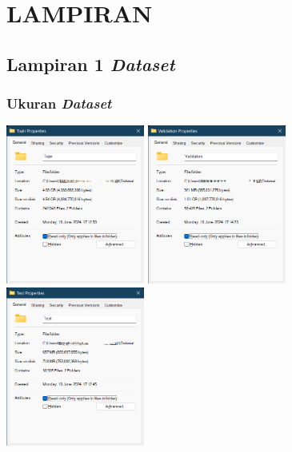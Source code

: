 \documentclass[12pt,oneside,bahasa]{book}
\newcommand{\appendixpagenumbering}{
    \renewcommand{\thepage}{L-\arabic{page}}
}
\begin{document}
\chapter*{LAMPIRAN}

\setcounter{page}{1}
\appendixpagenumbering
\thispagestyle{appendixstyle}
\pagestyle{appendixstyle}

\section*{Lampiran 1 \emph{Dataset}}


\subsection*{Ukuran \emph{Dataset}}
\begin{center}
  \includegraphics[width=4.55cm]{images/prop_train} \includegraphics[width=4.55cm]{images/prop_valid}
  \includegraphics[width=4.55cm]{images/prop_test}
  \par\end{center}
\end{document}
